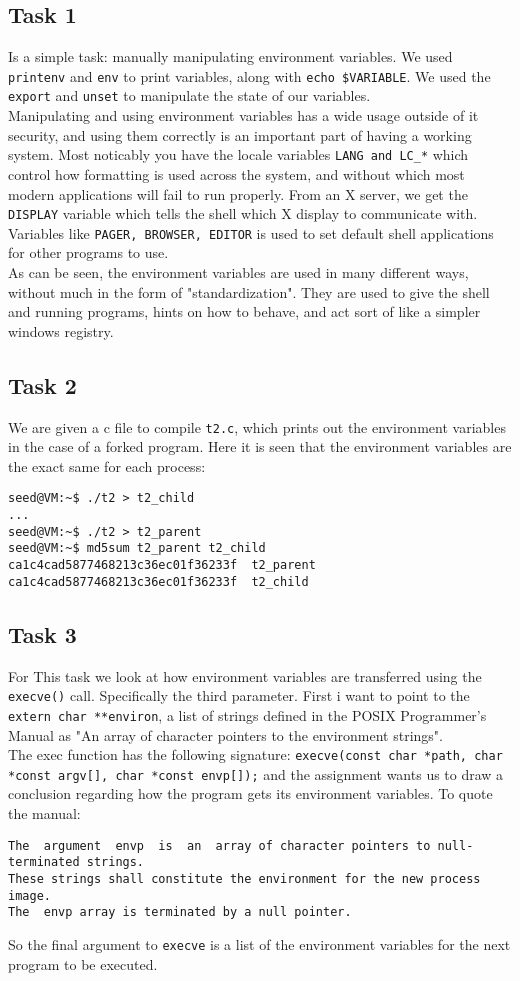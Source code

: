 \documentclass{article}
\begin{document}
\subsection{Task 1}
Is a simple task: manually manipulating environment variables. We used 
\verb!printenv! and \verb!env! to print variables, along with 
\verb"echo $VARIABLE". We used the \verb!export! and \verb!unset! to manipulate
the state of our variables.\\
Manipulating and using environment variables has a wide usage outside of it
security, and using them correctly is an important part of having a working
system. Most noticably you have the locale variables \verb!LANG and LC_*! which
control how formatting is used across the system, and without which most modern
applications will fail to run properly. From an X server, we get the \verb!DISPLAY!
variable which tells the shell which X display to communicate with. Variables
like \verb!PAGER, BROWSER, EDITOR! is used to set default shell applications for
other programs to use.\\
As can be seen, the environment variables are used in many different ways, without
much in the form of "standardization". They are used to give the shell and
running programs, hints on how to behave, and act sort of like a simpler windows
registry.
\subsection{Task 2}
We are given a c file to compile \verb!t2.c!, which prints out the environment
variables in the case of a forked program. Here it is seen that the environment
variables are the exact same for each process:
\begin{verbatim}
seed@VM:~$ ./t2 > t2_child
...
seed@VM:~$ ./t2 > t2_parent
seed@VM:~$ md5sum t2_parent t2_child
ca1c4cad5877468213c36ec01f36233f  t2_parent
ca1c4cad5877468213c36ec01f36233f  t2_child
\end{verbatim}
\subsection{Task 3}
For This task we look at how environment variables are transferred using the
\verb!execve()! call. Specifically the third parameter. First i want to point
to the \verb!extern char **environ!, a list of strings defined in the POSIX
Programmer's Manual as "An array of character pointers to the environment 
strings".\\
The exec function has the following signature: 
\verb!execve(const char *path, char *const argv[], char *const envp[]);! and
the assignment wants us to draw a conclusion regarding how the program gets
its environment variables. To quote the manual:
\begin{verbatim}
The  argument  envp  is  an  array of character pointers to null-terminated strings.
These strings shall constitute the environment for the new process image.
The  envp array is terminated by a null pointer.
\end{verbatim}
So the final argument to \verb!execve! is a list of the environment variables
for the next program to be executed.
\end{document}
